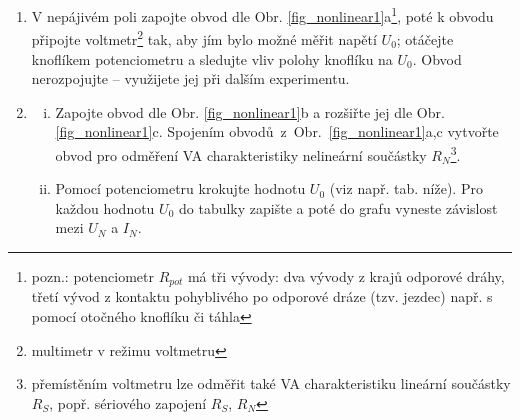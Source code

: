 \documentclass[a4paper, 11pt]{report}
\begin{document}
\begin{enumerate}[\bf {Experiment} 1:]

\item

V nepájivém poli zapojte obvod dle Obr. \ref{fig_nonlinear1}a\footnote{pozn.: 
potenciometr $R_{pot}$ má tři vývody: 
dva vývody z krajů odporové dráhy,
třetí vývod z kontaktu pohyblivého po odporové dráze (tzv. jezdec) např. s pomocí otočného knoflíku či táhla},
poté
k obvodu připojte voltmetr\footnote{multimetr v režimu voltmetru} tak, aby jím bylo možné měřit napětí $U_0$;
otáčejte knoflíkem potenciometru a
sledujte vliv polohy knoflíku na $U_0$. Obvod nerozpojujte -- využijete jej při dalším experimentu.

\item

\begin{enumerate}[i)]
\item 
Zapojte obvod dle Obr. \ref{fig_nonlinear1}b
a rozšiřte jej dle Obr. \ref{fig_nonlinear1}c.
Spojením obvodů~z~Obr.~\ref{fig_nonlinear1}a,c vytvořte obvod pro odměření VA charakteristiky
nelineární součástky $R_N$\footnote{přemístěním voltmetru lze  odměřit také VA charakteristiku 
lineární součástky $R_S$, popř. sériového zapojení $R_S$, $R_N$}.
\item 
Pomocí potenciometru krokujte hodnotu $U_0$ (viz např. tab. níže).
Pro každou hodnotu $U_0$ 
do tabulky zapište a poté do grafu vyneste závislost mezi $U_N$ a $I_N$.
\end{enumerate}

\vspace{-2mm}
\begin{table}[h]
\hspace{35mm}
\label{tab:va}
\end{table}
\vspace{-2mm}


\end{enumerate}
\end{document}
